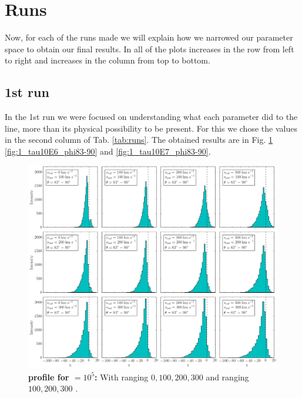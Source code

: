 \section{Runs}

Now, for each of the runs made we will explain how we narrowed our parameter space to obtain our final results. In all of the plots \vrot increases in the row from left to right and \vout increases in the column from top to bottom.\\ 

\newpage

\subsection{1st run}
In the 1st run we were focused on understanding what each parameter did to the line, more than its physical possibility to be present. For this we chose the values in the second column of Tab. \ref{tab:runs}. The obtained results are in Fig. \ref{fig:1_tau10E5_phi83-90} \ref{fig:1_tau10E6_phi83-90} and \ref{fig:1_tau10E7_phi83-90}.\\

\begin{figure}[h!]
	\begin{center}
		\includegraphics[width=1\textwidth]{./figures/chapter3/1_tau10E5_phi83-90}
	\end{center}
	\caption{\textbf{\lya profile for \tauh$=10^5$:} With \vrot ranging $0,100,200,300$ \kms and \vout ranging $100,200,300$ \kms.
		\label{fig:1_tau10E5_phi83-90}}
\end{figure}

